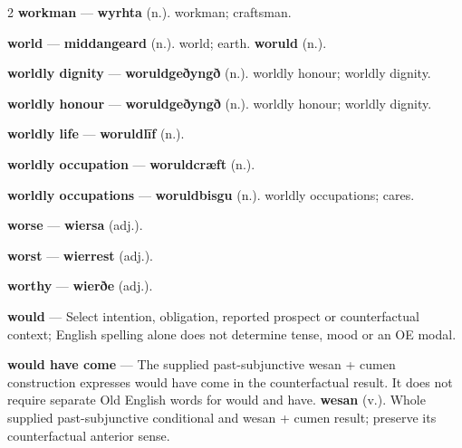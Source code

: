 \begin{multicols}{2}
\textbf{workman} — \textbf{wyrhta} (n.). workman; craftsman.\par
\textbf{world} — \textbf{middangeard} (n.). world; earth. \textbf{woruld} (n.).\par
\textbf{worldly dignity} — \textbf{woruldgeðyngð} (n.). worldly honour; worldly dignity.\par
\textbf{worldly honour} — \textbf{woruldgeðyngð} (n.). worldly honour; worldly dignity.\par
\textbf{worldly life} — \textbf{woruldlīf} (n.).\par
\textbf{worldly occupation} — \textbf{woruldcræft} (n.).\par
\textbf{worldly occupations} — \textbf{woruldbisgu} (n.). worldly occupations; cares.\par
\textbf{worse} — \textbf{wiersa} (adj.).\par
\textbf{worst} — \textbf{wierrest} (adj.).\par
\textbf{worthy} — \textbf{wierðe} (adj.).\par
\textbf{would} — Select intention, obligation, reported prospect or counterfactual context; English spelling alone does not determine tense, mood or an OE modal.\par
\textbf{would have come} — The supplied past-subjunctive wesan + cumen construction expresses would have come in the counterfactual result. It does not require separate Old English words for would and have. \textbf{wesan} (v.). Whole supplied past-subjunctive conditional and wesan + cumen result; preserve its counterfactual anterior sense.\par

\end{multicols}
